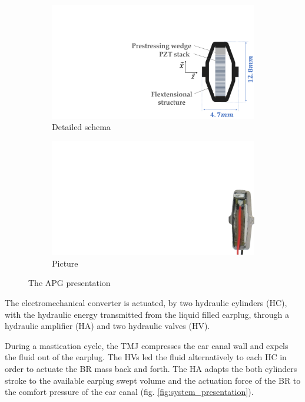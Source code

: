 \documentclass[3p,twocolumn,preprint]{elsarticle}
\def \hfillx {\hspace*{ -\linewidth} \hfill} %
\begin{document}
\begin{figure}[!htb]
	\begin{center}
		\begin{subfigure}[t]{0.5\linewidth}
			\captionsetup{justification=centering}
			\includegraphics[trim={13cm 0cm 0cm 6cm},clip,width=\linewidth]{figures/APG_schema.pdf}
			\caption{Detailed schema}
			\label{fig:APG_schema}
		\end{subfigure}
		\hfillx
		\begin{subfigure}[t]{0.21\linewidth}
			\captionsetup{justification=centering}
			\includegraphics[trim={29.5cm 0cm 0cm 8cm},clip,width=0.65\linewidth]{figures/APG_photo.pdf}
			\caption{Picture}
			\label{fig:APG_photo}
		\end{subfigure}
		\caption{The APG presentation}
		\label{fig:APG}
	\end{center}
\end{figure}

The electromechanical converter is actuated, by two hydraulic cylinders (HC), with the hydraulic energy transmitted from the liquid filled earplug, through a hydraulic amplifier (HA) and two hydraulic valves (HV).

During a mastication cycle, the TMJ compresses the ear canal wall and expels the fluid out of the earplug. The HVs led the fluid alternatively to each HC in order to actuate the BR mass back and forth. The HA adapts the both cylinders stroke to the available earplug swept volume and the actuation force of the BR to the comfort pressure of the ear canal (fig. \ref{fig:system_presentation}).
\end{document}
